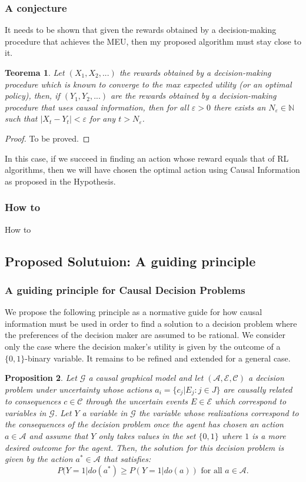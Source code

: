 \documentclass{beamer}
\theoremstyle{plain}
\newtheorem{teo}{Teorema}
\newtheorem{prop}[teo]{Proposition}
\begin{document}
\begin{frame}
\frametitle{A conjecture}
It needs to be shown that given the rewards obtained by a decision-making procedure that achieves the MEU, then my proposed algorithm must stay close to it.
\begin{teo}
Let $(X_1,X_2,...)$ the rewards obtained by a decision-making procedure which is known to converge to the max expected utility (or an optimal policy), then, if $(Y_1, Y_2,...)$ are the rewards obtained by a decision-making procedure that uses causal information, then for all $\varepsilon > 0$ there exists an $N_\varepsilon \in \mathbb{N}$ such that $ | X_t - Y_t | < \varepsilon$ for any $t > N_\varepsilon$. 
\end{teo}
\begin{proof}
To be proved.
\end{proof}
\end{frame}

\begin{frame}
In this case, if we succeed in finding an action whose reward equals that of RL algorithms, then we will have chosen the optimal action using Causal Information as proposed in the Hypothesis.
\end{frame}

\begin{frame}
\frametitle{How to}
How to
\end{frame}

\subsection{Proposed Solutuion: A guiding principle}
\begin{frame}
\frametitle{A guiding principle for Causal Decision Problems}
We propose the following principle as a normative guide for how causal information must be used in order to find a solution to a decision problem where the preferences of the decision maker are assumed to be rational. We consider only the case where the decision maker's utility is given by the outcome of a $\{0,1 \}$-binary variable. It remains to be refined and extended for a general case. 
\end{frame}

\begin{frame}
\begin{prop}
Let  $\mathcal{G}$ a causal graphical model and let $(\mathcal{A},\mathcal{E},\mathcal{C})$ a decision problem under uncertainty whose actions $a_i = \{ c_j | E_j : j \in J \}$  are causally related to consequences $c \in \mathcal{C}$ through the uncertain events $E \in \mathcal{E}$ which correspond to variables in $\mathcal{G}$. Let $Y$ a variable in $\mathcal{G}$ the variable whose realizations correspond to the consequences of the decision problem once the agent has chosen an action $a \in \mathcal{A}$ and assume that $Y$ only takes values in the set $\{ 0,1\}$ where $1$ is a more desired outcome for the agent. Then, the $\textit{solution}$ for this decision problem is given by the action $a^\ast \in \mathcal{A}$ that satisfies:
\[ P(Y=1 | do(a^\ast) \geq P(Y=1 | do(a)) \textrm{ for all } a \in \mathcal{A}. \]
\end{prop}
\end{frame}
\end{document}
